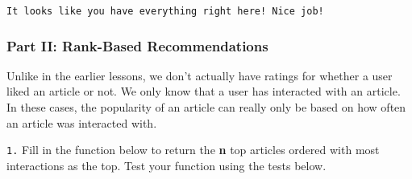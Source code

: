 \documentclass[11pt]{article}
\begin{document}
    \begin{Verbatim}[commandchars=\\\{\}]
It looks like you have everything right here! Nice job!

    \end{Verbatim}

    \hypertarget{part-ii-rank-based-recommendations}{%
\subsubsection{Part II: Rank-Based
Recommendations}\label{part-ii-rank-based-recommendations}}

Unlike in the earlier lessons, we don't actually have ratings for
whether a user liked an article or not. We only know that a user has
interacted with an article. In these cases, the popularity of an article
can really only be based on how often an article was interacted with.

\texttt{1.} Fill in the function below to return the \textbf{n} top
articles ordered with most interactions as the top. Test your function
using the tests below.
\end{document}
